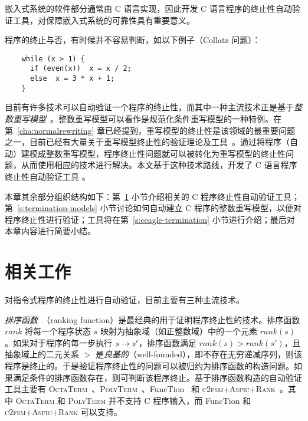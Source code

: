 嵌入式系统的软件部分通常由 C 语言实现，因此开发 C 语言程序的终止性自动验证工具，对保障嵌入式系统的可靠性具有重要意义。 

程序的终止与否，有时候并不容易判断，如以下例子（Collatz 问题）：
\begin{verbatim}
    while (x > 1) {
      if (even(x))  x = x / 2;
      else  x = 3 * x + 1;
    }
\end{verbatim} 
目前有许多技术可以自动验证一个程序的终止性，而其中一种主流技术正是基于\emph{整数重写模型}~\cite{DBLP:conf/rta/FalkeKS11}。整数重写模型可以看作是规范化条件重写模型的一种特例。在第~\ref{cha:normalrewriting} 章已经提到，重写模型的终止性是该领域的最重要问题之一，目前已经有大量关于重写模型终止性的验证理论及工具~\cite{terese,DBLP:conf/rta/1995,DBLP:journals/iandc/GeserHWZ07,DBLP:journals/tcs/Payet08,DBLP:journals/tcs/Lescanne94,DBLP:conf/tlca/JouannaudL15,DBLP:journals/jsc/Dershowitz87,knuth1983simple,DBLP:journals/tcs/ArtsG00,DBLP:journals/jsc/GieslAO02,DBLP:conf/rta/GieslTSF04,DBLP:conf/lpar/Kop015,DBLP:conf/rta/KorpSZM09}。通过将程序（自动）建模成整数重写模型，程序终止性问题就可以被转化为重写模型的终止性问题，从而使用相应的技术进行解决。本文基于这种技术路线，开发了 C 语言程序终止性自动验证工具 \CTerm。

本章其余部分组织结构如下：第~\ref{s:termination-related} 小节介绍相关的 C 程序终止性自动验证工具；第~\ref{s:termination-models} 小节讨论如何自动建立 C 程序的整数重写模型，以便对程序终止性进行验证；\CTerm 工具将在第~\ref{s:ceagle-termination} 小节进行介绍；最后对本章内容进行简要小结。 

\section{相关工作}
\label{s:termination-related}

对指令式程序的终止性进行自动验证，目前主要有三种主流技术。

\emph{排序函数}~\cite{DBLP:conf/lics/PodelskiR04}（ranking function）是最经典的用于证明程序终止性的技术。排序函数 $rank$ 将每一个程序状态 $s$ 映射为抽象域（如正整数域）中的一个元素 $rank(s)$。如果对于程序的每一步执行 $s \rightarrow s'$，排序函数满足 $rank(s) > rank(s')$，且抽象域上的二元关系 $>$ 是\emph{良基的}（well-founded），即不存在无穷递减序列，则该程序是终止的。于是验证程序终止性的问题可以被归约为排序函数的构造问题。如果满足条件的排序函数存在，则可判断该程序终止。基于排序函数构造的自动验证工具主要有 \textsc{OctaTerm}~\cite{DBLP:conf/popl/BerdineCCDO07}、\textsc{PolyTerm}~\cite{DBLP:conf/popl/BerdineCCDO07}、FuncTion~\cite{DBLP:conf/sas/Urban13,DBLP:conf/tacas/Urban15} 和 \textsc{c2fsm+Aspic+Rank}~\cite{DBLP:conf/sas/AliasDFG10}。其中 \textsc{OctaTerm} 和 \textsc{PolyTerm} 并不支持 C 程序输入，而 FuncTion 和 \textsc{c2fsm+Aspic+Rank} 可以支持。


